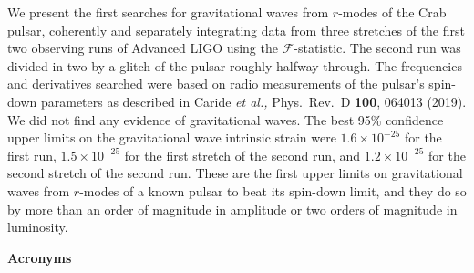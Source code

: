 \documentclass{ttuthes2007}
\begin{document}
We present the first searches for gravitational waves from $r$-modes of the Crab
pulsar, coherently and separately integrating data from three stretches of the  
first two observing runs of Advanced LIGO using the $\mathcal{F}$-statistic.    
The second run was divided in two by a glitch of the pulsar roughly halfway     
through.  The frequencies and derivatives searched were based on radio          
measurements of the pulsar's spin-down parameters as described in Caride        
\textit{et al.,} Phys.\ Rev.\ D \textbf{100}, 064013 (2019).  We did not find   
any evidence of gravitational waves. The best 95\% confidence upper limits on   
the gravitational wave intrinsic strain were $1.6\times10^{-25}$ for the first  
run, $1.5\times10^{-25}$ for the first stretch of the second run, and           
$1.2\times10^{-25}$ for the second stretch of the second run. These are the     
first upper limits on gravitational waves from $r$-modes of a known pulsar to   
beat its spin-down limit, and they do so by more than an order of magnitude in  
amplitude or two orders of magnitude in luminosity.                             
                                          


\listoftables	%

\listoffigures	%
\newpage
\textbf{Acronyms}
\begin{acronym}[OCSVM]
\end{acronym}
\end{document}

